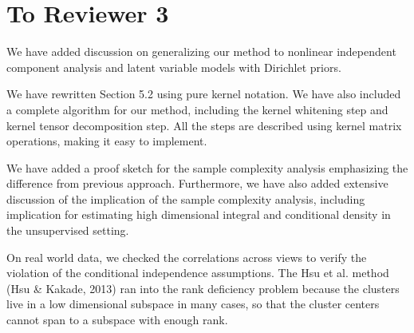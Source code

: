 \documentclass{article}
\begin{document}
\section*{To Reviewer 3}

We have added discussion on generalizing our method to nonlinear independent component analysis and latent variable models with Dirichlet priors.

We have rewritten Section 5.2 using pure kernel notation.
We have also included a complete algorithm for our method, including the kernel whitening step and kernel tensor decomposition step. All the steps are described using kernel matrix operations, making it easy to implement.

We have added a proof sketch for the sample complexity analysis emphasizing the difference from previous approach. Furthermore, we have also added extensive discussion of the implication of the sample complexity analysis, including implication for estimating high dimensional integral and conditional density in the unsupervised setting.

On real world data, we checked the correlations across views to verify the violation of the conditional independence assumptions. The Hsu et al. method (Hsu \& Kakade, 2013) ran into the rank deficiency problem because the clusters live in a low dimensional subspace in many cases, so that the cluster centers cannot span to a subspace with enough rank.
\end{document}
